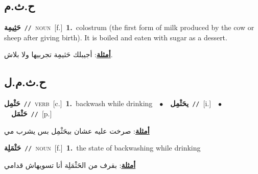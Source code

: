 \documentclass[10pt,a4paper,twoside]{article} %
\begin{document}
\begin{multicols}{2}
{{{{{{{{{\vspace{-3mm}
\subsection*{\color{blue}\foreignlanguage{arabic}{ح.ث.م}\color{blue}{}} 

{\setlength\topsep{0pt}\textbf{\foreignlanguage{arabic}{حَثِيمِة}}\ {\color{gray}\texttt{//}\color{black}}\ \textsc{noun}\ [f.]\ \textbf{1.}~colostrum (the first form of milk produced by the cow or sheep after giving birth). It is boiled and eaten with sugar as a dessert.\  \begin{flushright}\color{gray}\foreignlanguage{arabic}{\textbf{\underline{\foreignlanguage{arabic}{أمثلة}}}: أجيبلك حَثيمِة تجربيها ولا بلاش.}\end{flushright}\color{black}} \vspace{2mm}

\vspace{-3mm}
\subsection*{\color{blue}\foreignlanguage{arabic}{ح.ث.م.ل}\color{blue}{}} 

{\setlength\topsep{0pt}\textbf{\foreignlanguage{arabic}{حَثْمِل}}\ {\color{gray}\texttt{//}\color{black}}\ \textsc{verb}\ [c.]\ \textbf{1.}~backwash while drinking\ \ $\bullet$\ \ \setlength\topsep{0pt}\textbf{\foreignlanguage{arabic}{يحَثْمِل}}\ {\color{gray}\texttt{//}\color{black}}\ [i.]\ \ $\bullet$\ \ \setlength\topsep{0pt}\textbf{\foreignlanguage{arabic}{حَثْمَل}}\ {\color{gray}\texttt{//}\color{black}}\ [p.]\  \begin{flushright}\color{gray}\foreignlanguage{arabic}{\textbf{\underline{\foreignlanguage{arabic}{أمثلة}}}: صرخت عليه عشان بيحَثْمِل بس يشرب مي}\end{flushright}\color{black}} \vspace{2mm}

{\setlength\topsep{0pt}\textbf{\foreignlanguage{arabic}{حَثْمَلِة}}\ {\color{gray}\texttt{//}\color{black}}\ \textsc{noun}\ [f.]\ \textbf{1.}~the state of backwashing while drinking\  \begin{flushright}\color{gray}\foreignlanguage{arabic}{\textbf{\underline{\foreignlanguage{arabic}{أمثلة}}}: بقرف من الحَثْمَلِة أنا تسويهاش قدامي}\end{flushright}\color{black}} \vspace{2mm}

}}}}}}}}}
\end{multicols}
\end{document}
